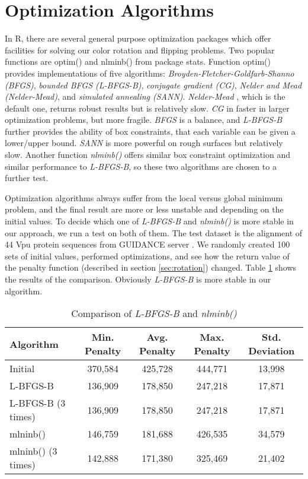 \section{Optimization Algorithms}

In R, there are several general purpose optimization packages which offer facilities for solving our color rotation and flipping problems. Two popular functions are optim() and nlminb() from package stats. Function optim() provides implementations of five algorithms: \emph{Broyden-Fletcher-Goldfarb-Shanno (BFGS)}, \emph{bounded BFGS (L-BFGS-B)}, \emph{conjugate gradient (CG)}, \emph{Nelder and Mead (Nelder-Mead)}, and \emph{simulated annealing (SANN)}. \emph{Nelder-Mead} \cite{Nelder:1965aa}, which is the default one, returns robust results but is relatively slow. \emph{CG} \cite{Fletcher:1964aa} in faster in larger optimization problems, but more fragile. \emph{BFGS} is a balance, and \emph{L-BFGS-B} further provides the ability of box constraints, that each variable can be given a lower/upper bound. \emph{SANN} \cite{Belisle:1992aa} is more powerful on rough surfaces but relatively slow. Another function \emph{nlminb()} offers similar box constraint optimization and similar performance to \emph{L-BFGS-B}, so these two algorithms are chosen to a further test.

Optimization algorithms always suffer from the local versus global minimum problem, and the final result are more or less unstable and depending on the initial values. To decide which one of \emph{L-BFGS-B} and \emph{nlminb()} is more stable in our approach, we run a test on both of them. The test dataset is the alignment of 44 Vpu protein sequences from GUIDANCE server \cite{Penn:2010ab}. We randomly created 100 sets of initial values, performed optimizations, and see how the return value of the penalty function (described in section \ref{sec:rotation}) changed. Table \ref{tab:optim-comp} shows the results of the comparison. Obviously \emph{L-BFGS-B} is more stable in our algorithm.

\begin{table}[hb]
\caption{Comparison of \emph{L-BFGS-B} and \emph{nlminb()}}\label{tab:optim-comp}\centering\small
\begin{tabular}{lcccc} \toprule
  Algorithm           & Min. Penalty  & Avg. Penalty  & Max. Penalty  & Std. Deviation  \\ \hline
  Initial             & 370,584       & 425,728       & 444,771       & 13,998          \\
  L-BFGS-B            & 136,909       & 178,850       & 247,218       & 17,871          \\
  L-BFGS-B (3 times)  & 136,909       & 178,850       & 247,218       & 17,871          \\
  mlninb()            & 146,759       & 181,688       & 426,535       & 34,579          \\
  mlninb() (3 times)  & 142,888       & 171,380       & 325,469       & 21,402          \\ \bottomrule
\end{tabular}
\end{table}
